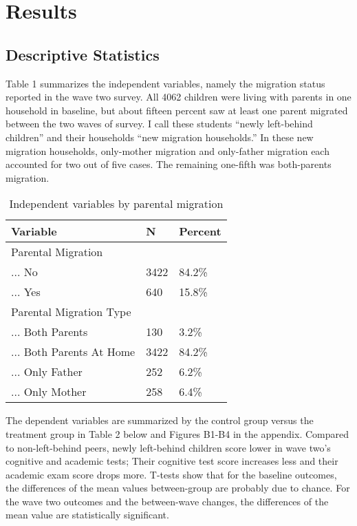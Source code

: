 \documentclass[
  man,floatsintext]{apa7}
\begin{document}
\newpage

\hypertarget{results}{%
\section{Results}\label{results}}

\hypertarget{descriptive-statistics}{%
\subsection{Descriptive Statistics}\label{descriptive-statistics}}

Table 1 summarizes the independent variables, namely the migration status reported in the wave two survey. All 4062 children were living with parents in one household in baseline, but about fifteen percent saw at least one parent migrated between the two waves of survey. I call these students ``newly left-behind children'' and their households ``new migration households.'' In these new migration households, only-mother migration and only-father migration each accounted for two out of five cases. The remaining one-fifth was both-parents migration.

\renewcommand{\arraystretch}{0.72}

\begin{table}

\caption{\label{tab:unnamed-chunk-1}Independent variables by parental migration}
\centering
\begin{tabular}[t]{lll}
\toprule
Variable & N & Percent\\
\midrule
Parental Migration &  & \\
... No & 3422 & 84.2\%\\
... Yes & 640 & 15.8\%\\
Parental Migration Type &  & \\
... Both Parents & 130 & 3.2\%\\
... Both Parents At Home & 3422 & 84.2\%\\
... Only Father & 252 & 6.2\%\\
... Only Mother & 258 & 6.4\%\\
\bottomrule
\end{tabular}
\end{table}

\newpage

The dependent variables are summarized by the control group versus the treatment group in Table 2 below and Figures B1-B4 in the appendix. Compared to non-left-behind peers, newly left-behind children score lower in wave two's cognitive and academic tests; Their cognitive test score increases less and their academic exam score drops more. T-tests show that for the baseline outcomes, the differences of the mean values between-group are probably due to chance. For the wave two outcomes and the between-wave changes, the differences of the mean value are statistically significant.
\end{document}
